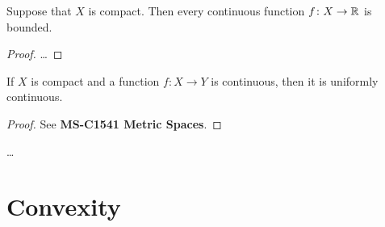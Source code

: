 \begin{theorem}
  \label{thm:continuous_on_compact_implies_bounded}
  Suppose that $X$ is compact.
  Then every continuous function $f \colon X \to \mathbb{R}$
  is bounded.
\end{theorem}
\begin{proof}
  \ldots
\end{proof}

\begin{lemma}
  \label{lem:on_compact_continuous_implies_uniformly_continuous}
  If $X$ is compact and a function $f \colon X \to Y$ is continuous, then it is uniformly continuous.
\end{lemma}
\begin{proof}
  See \textbf{MS-C1541 Metric Spaces}.
\end{proof}

\begin{theorem}
  \label{thm:intersect_nested_compacts}
  \ldots
\end{theorem}

\section{Convexity}
